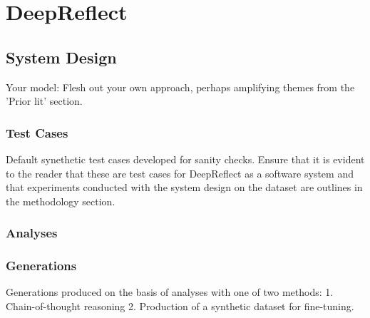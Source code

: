 
\section{DeepReflect}

\subsection{System Design}\label{sec:deepreflect}
\textcolor{black!40}{Your model: Flesh out your own approach, perhaps amplifying themes from the 'Prior lit' section.}

\subsubsection{Test Cases}
\textcolor{black!40}{Default synethetic test cases developed for sanity checks.}
\textcolor{black!40}{Ensure that it is evident to the reader that these are test cases for DeepReflect as a software system and that experiments conducted with the system design on the dataset are outlines in the methodology section.}
\textcolor{black!30}{\lipsum[9-10]}

\subsubsection{Analyses}
\textcolor{black!30}{\lipsum[8-9]}

\subsubsection{Generations}
\textcolor{black!40}{Generations produced on the basis of analyses with one of two methods: 1. Chain-of-thought reasoning 2. Production of a synthetic dataset for fine-tuning.}
\textcolor{black!30}{\lipsum[9-10]}

